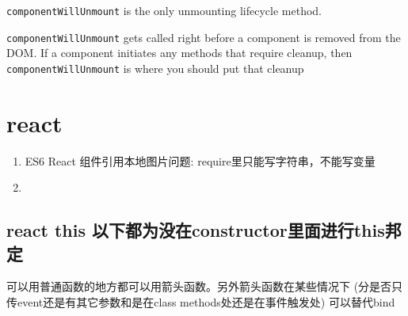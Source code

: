 \documentclass[a4paper, 12pt]{article}
\begin{document}
\verb|componentWillUnmount| is the only unmounting lifecycle method.

\verb|componentWillUnmount| gets called right before a component is removed from the DOM. If a component initiates any methods that require cleanup, then \verb|componentWillUnmount| is where you should put that cleanup


\section{react}
\begin{enumerate}
\item ES6 React 组件引用本地图片问题: require里只能写字符串，不能写变量

\item 

\end{enumerate}

\subsection{react this {\color{red}以下都为没在constructor里面进行this邦定}}
可以用普通函数的地方都可以用箭头函数。另外箭头函数在某些情况下 (分是否只传event还是有其它参数和是在class methods处还是在事件触发处) 可以替代bind
\end{document}
